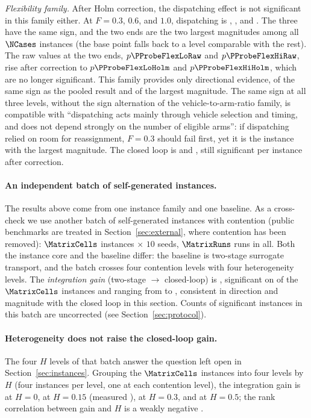 \emph{Flexibility family.}
After Holm correction, the dispatching effect is not significant in this family either.
At $F=0.3$, $0.6$, and $1.0$, dispatching is \GainProbeFlexLo{}, \GainProbeFleetBase{}, and \GainProbeFlexHi{}. The three have the same sign, and the two ends are the two largest magnitudes among all $\NCases$ instances (the base point falls back to a level comparable with the rest). The raw values at the two ends, $p\PProbeFlexLoRaw$ and $p\PProbeFlexHiRaw$, rise after correction to $p\PProbeFlexLoHolm$ and $p\PProbeFlexHiHolm$, which are no longer significant.
This family provides only directional evidence, of the same sign as the pooled result and of the largest magnitude.
The same sign at all three levels, without the sign alternation of the vehicle-to-arm-ratio family, is compatible with ``dispatching acts mainly through vehicle selection and timing, and does not depend strongly on the number of eligible arms'': if dispatching relied on room for reassignment, $F=0.3$ should fail first, yet it is the instance with the largest magnitude.
The closed loop is \GainLoopFlexLo{} and \GainLoopFlexHi{}, still significant per instance after correction.

\paragraph{An independent batch of self-generated instances.}
The results above come from one instance family and one baseline. As a cross-check we use another batch of self-generated instances with contention (public benchmarks are treated in Section~\ref{sec:external}, where contention has been removed): $\MatrixCells$ instances $\times$ $10$ seeds, $\MatrixRuns$ runs in all.
Both the instance core and the baseline differ: the baseline is two-stage surrogate transport, and the batch crosses four contention levels with four heterogeneity levels.
The \emph{integration gain} (two-stage $\to$ closed-loop) is \GainIntegMatrix{}, significant on \SigIntegMatrix{} of the $\MatrixCells$ instances and ranging from \GainIntegMatrixLo{} to \GainIntegMatrixHi{}, consistent in direction and magnitude with the closed loop in this section.
Counts of significant instances in this batch are uncorrected (see Section~\ref{sec:protocol}).

\paragraph{Heterogeneity does not raise the closed-loop gain.}
The four $H$ levels of that batch answer the question left open in Section~\ref{sec:instances}. Grouping the $\MatrixCells$ instances into four levels by $H$ (four instances per level, one at each contention level), the integration gain is \GainIntegHZero{} at $H=0$, \GainIntegHLow{} at $H=0.15$ (measured \MatrixHMeasLow{}), \GainIntegHMid{} at $H=0.3$, and \GainIntegHHigh{} at $H=0.5$; the rank correlation between gain and $H$ is a weakly negative \RhoIntegH{}.

